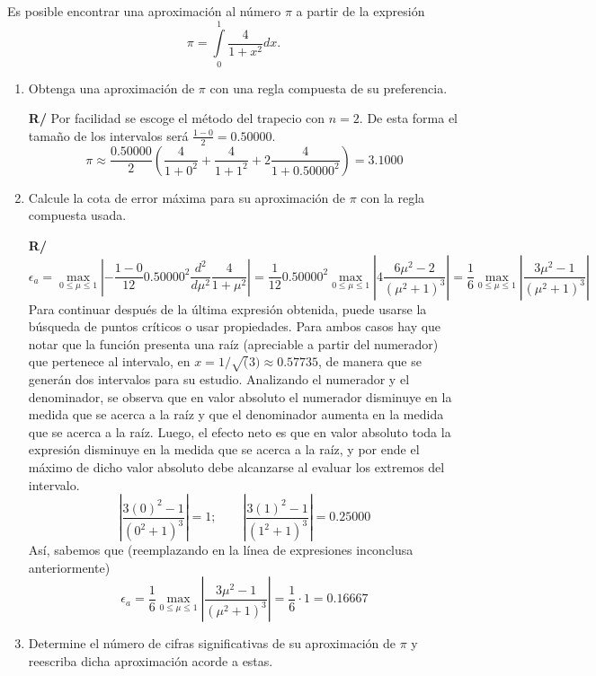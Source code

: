 \documentclass[12pt]{article}
\newcommand{\diff}[3]{\frac{d^{#3} #1}{d#2^{#3}}}
\begin{document}
  \begin{enumerate}[leftmargin=*,widest=9]
{\footnotesize
    \item Es posible encontrar una aproximación al número \(\pi \) a partir de la expresión
    \[ \pi = \int\limits_0^1 \frac{4}{1+x^2}dx.\]
    \begin{enumerate}[label=\alph*]
    \item Obtenga una aproximación de \(\pi \) con una regla compuesta de su preferencia.

\textbf{R/} Por facilidad se escoge el método del trapecio con \(n=2\). De esta forma el tamaño de los intervalos será \( \frac{1-0}{2} = 0.50000\).
    \[ \pi \approx \frac{0.50000}{2}\left(\frac{4}{1+0^2} + \frac{4}{1+1^2} + 2\frac{4}{1+0.50000^2}\right) = 3.1000 \]
    \item Calcule la cota de error máxima para su aproximación de \(\pi \) con la regla compuesta usada.

\textbf{R/}
\[
\epsilon_a = \max\limits_{0 \leq \mu \leq 1} \left\vert -\frac{1-0}{12}0.50000^2\diff{}{\mu}{2}\frac{4}{1+\mu^2} \right\vert = \frac{1}{12}0.50000^2 \max\limits_{0 \leq \mu \leq 1} \left\vert 4\frac{6\mu^2-2}{{(\mu^2+1)}^3} \right\vert = \frac{1}{6} \max\limits_{0 \leq \mu \leq 1} \left\vert \frac{3\mu^2-1}{{(\mu^2+1)}^3} \right\vert
\]
Para continuar después de la última expresión obtenida, puede usarse la búsqueda de puntos críticos o usar propiedades.
Para ambos casos hay que notar que la función presenta una raíz (apreciable a partir del numerador) que pertenece al intervalo, en \(x = 1/\sqrt(3) \approx 0.57735\), de manera que se generán dos intervalos para su estudio.
Analizando el numerador y el denominador, se observa que en valor absoluto el numerador disminuye en la medida que se acerca a la raíz y que el denominador aumenta en la medida que se acerca a la raíz. Luego, el efecto neto es que en valor absoluto toda la expresión disminuye en la medida que se acerca a la raíz, y por ende el máximo de dicho valor absoluto debe alcanzarse al evaluar los extremos del intervalo.
\[
\left\vert \frac{3{(0)}^2-1}{{(0^2+1)}^3} \right\vert = 1; \qquad \left\vert \frac{3{(1)}^2-1}{{(1^2+1)}^3} \right\vert = 0.25000
\]
Así, sabemos que (reemplazando en la línea de expresiones inconclusa anteriormente)
\[
\epsilon_a = \frac{1}{6} \max\limits_{0 \leq \mu \leq 1} \left\vert \frac{3\mu^2-1}{{(\mu^2+1)}^3} \right\vert = \frac{1}{6}\cdot 1 = 0.16667
\]
    \item Determine el número de cifras significativas de su aproximación de \(\pi \) y reescriba dicha aproximación acorde a estas.


\end{enumerate}}
\end{enumerate}
\end{document}
